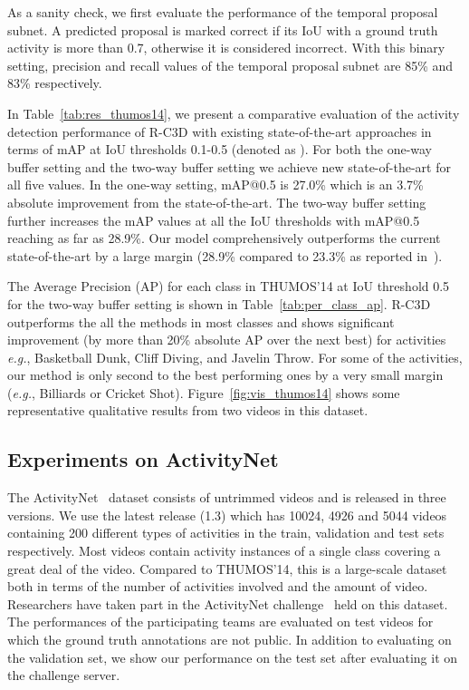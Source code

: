 \documentclass[10pt,twocolumn,letterpaper]{article}
\newcommand{\modelname}[0]{R-C3D }
\begin{document}
As a sanity check, we first evaluate the performance of the temporal proposal subnet.
A predicted proposal is marked correct if its IoU with a ground truth activity is more than 0.7, otherwise it is considered incorrect.
With this binary setting, precision and recall values of the temporal proposal subnet are 85\% and 83\% respectively.

In Table~\ref{tab:res_thumos14}, we present a comparative evaluation of the activity detection performance of \modelname with existing state-of-the-art approaches in terms of mAP at IoU thresholds 0.1-0.5 (denoted as ).
For both the one-way buffer setting and the two-way buffer setting we achieve new state-of-the-art for all five  values.
In the one-way setting, mAP@0.5 is 27.0\% which is an 3.7\% absolute improvement from the state-of-the-art.
The two-way buffer setting further increases the mAP values at all the IoU thresholds with mAP@0.5 reaching as far as 28.9\%.
Our model comprehensively outperforms the current state-of-the-art by a large margin (28.9\% compared to 23.3\% as reported in~\cite{shou2017cdc}).

The Average Precision (AP) for each class in THUMOS'14 at IoU threshold 0.5 for the two-way buffer setting is shown in Table~\ref{tab:per_class_ap}.
\modelname outperforms the all the methods in most classes and shows significant improvement (by more than 20\% absolute AP over the next best) for activities \textit{e.g.}, Basketball Dunk, Cliff Diving, and Javelin Throw.
For some of the activities, our method is only second to the best performing ones by a very small margin (\textit{e.g.}, Billiards or Cricket Shot).
Figure~\ref{fig:vis_thumos14} shows some representative qualitative results from two videos in this dataset.

\subsection{Experiments on ActivityNet}
\label{exp:activitynet}


The ActivityNet~\cite{caba2015activitynet} dataset consists of untrimmed videos and is released in three versions.
We use the latest release (1.3) which has 10024, 4926 and 5044 videos containing 200 different types of activities in the train, validation and test sets respectively.
Most videos contain activity instances of a single class covering a great deal of the video.
Compared to THUMOS'14, this is a large-scale dataset both in terms of the number of activities involved and the amount of video.
Researchers have taken part in the ActivityNet challenge~\cite{activitynetChallenge} held on this dataset.
The performances of the participating teams are evaluated on test videos for which the ground truth annotations are not public.
In addition to evaluating on the validation set, we show our performance on the test set after evaluating it on the challenge server.
\end{document}
